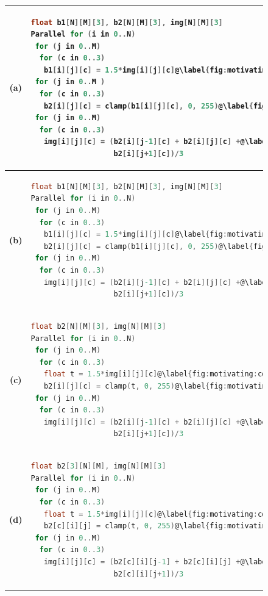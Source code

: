 \begin{figure}[t!]

\centering
\scriptsize

\begin{tabular}{cl}
{\textbf{\normalsize(a)}} &

\begin{lstlisting}[language=C,escapechar=@]
float b1[N][M][3], b2[N][M][3], img[N][M][3]
Parallel for (i in 0..N)
 for (j in 0..M)
  for (c in 0..3)
   b1[i][j][c] = 1.5*img[i][j][c]@\label{fig:motivating:code2:stmt1}@
 for (j in 0..M )
  for (c in 0..3)
   b2[i][j][c] = clamp(b1[i][j][c], 0, 255)@\label{fig:motivating:code2:stmt2}@
 for (j in 0..M)
  for (c in 0..3)
   img[i][j][c] = (b2[i][j-1][c] + b2[i][j][c] +@\label{fig:motivating:code2:stmt3}@
                   b2[i][j+1][c])/3
\end{lstlisting}

\\\hline

{\textbf{\normalsize(b)}} &
\begin{lstlisting}[language=C,escapechar=@]
float b1[N][M][3], b2[N][M][3], img[N][M][3]
Parallel for (i in 0..N)
 for (j in 0..M)
  for (c in 0..3)
   b1[i][j][c] = 1.5*img[i][j][c]@\label{fig:motivating:code3:stmt1}@
   b2[i][j][c] = clamp(b1[i][j][c], 0, 255)@\label{fig:motivating:code3:stmt2}@
 for (j in 0..M)
  for (c in 0..3)
   img[i][j][c] = (b2[i][j-1][c] + b2[i][j][c] +@\label{fig:motivating:code3:stmt3}@
                   b2[i][j+1][c])/3
\end{lstlisting}

\\\hline

{\textbf{\normalsize(c)}} &
\begin{lstlisting}[language=C,escapechar=@]
float b2[N][M][3], img[N][M][3]
Parallel for (i in 0..N)
 for (j in 0..M)
  for (c in 0..3)
   float t = 1.5*img[i][j][c]@\label{fig:motivating:code4:stmt1}@
   b2[i][j][c] = clamp(t, 0, 255)@\label{fig:motivating:code4:stmt2}@
 for (j in 0..M)
  for (c in 0..3)
   img[i][j][c] = (b2[i][j-1][c] + b2[i][j][c] +@\label{fig:motivating:code4:stmt3}@
                   b2[i][j+1][c])/3
\end{lstlisting}

\\\hline

{\textbf{\normalsize(d)}} & 
\begin{lstlisting}[language=C,escapechar=@]
float b2[3][N][M], img[N][M][3]
Parallel for (i in 0..N)
 for (j in 0..M)
  for (c in 0..3)
   float t = 1.5*img[i][j][c]@\label{fig:motivating:code5:stmt1}@
   b2[c][i][j] = clamp(t, 0, 255)@\label{fig:motivating:code5:stmt2}@
 for (j in 0..M)
  for (c in 0..3)
   img[i][j][c] = (b2[c][i][j-1] + b2[c][i][j] +@\label{fig:motivating:code5:stmt3}@
                   b2[c][i][j+1])/3
\end{lstlisting}


\end{tabular}
\end{figure}
